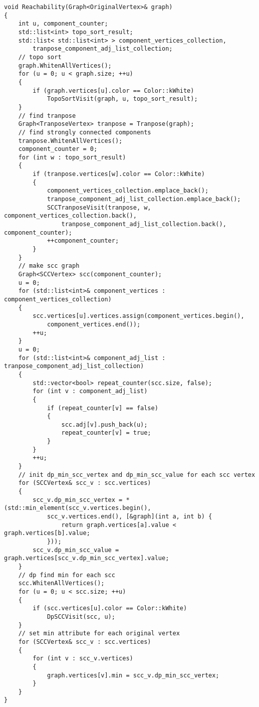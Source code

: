 \begin{verbatim}
void Reachability(Graph<OriginalVertex>& graph)
{
    int u, component_counter;
    std::list<int> topo_sort_result;
    std::list< std::list<int> > component_vertices_collection, 
        tranpose_component_adj_list_collection;
    // topo sort
    graph.WhitenAllVertices();
    for (u = 0; u < graph.size; ++u)
    {
        if (graph.vertices[u].color == Color::kWhite)
            TopoSortVisit(graph, u, topo_sort_result);
    }
    // find tranpose
    Graph<TranposeVertex> tranpose = Tranpose(graph);
    // find strongly connected components
    tranpose.WhitenAllVertices();
    component_counter = 0;
    for (int w : topo_sort_result)
    {
        if (tranpose.vertices[w].color == Color::kWhite)
        {
            component_vertices_collection.emplace_back();
            tranpose_component_adj_list_collection.emplace_back();
            SCCTranposeVisit(tranpose, w, component_vertices_collection.back(), 
                tranpose_component_adj_list_collection.back(), component_counter);
            ++component_counter;
        }
    }
    // make scc graph
    Graph<SCCVertex> scc(component_counter);
    u = 0;
    for (std::list<int>& component_vertices : component_vertices_collection)
    {
        scc.vertices[u].vertices.assign(component_vertices.begin(), 
            component_vertices.end());
        ++u;
    }
    u = 0;
    for (std::list<int>& component_adj_list : tranpose_component_adj_list_collection)
    {
        std::vector<bool> repeat_counter(scc.size, false);
        for (int v : component_adj_list)
        {
            if (repeat_counter[v] == false)
            {
                scc.adj[v].push_back(u);
                repeat_counter[v] = true;
            }
        }
        ++u;
    }
    // init dp_min_scc_vertex and dp_min_scc_value for each scc vertex
    for (SCCVertex& scc_v : scc.vertices)
    {
        scc_v.dp_min_scc_vertex = *(std::min_element(scc_v.vertices.begin(), 
            scc_v.vertices.end(), [&graph](int a, int b) { 
                return graph.vertices[a].value < graph.vertices[b].value; 
            }));
        scc_v.dp_min_scc_value = graph.vertices[scc_v.dp_min_scc_vertex].value;
    }
    // dp find min for each scc
    scc.WhitenAllVertices();
    for (u = 0; u < scc.size; ++u)
    {
        if (scc.vertices[u].color == Color::kWhite)
            DpSCCVisit(scc, u);
    }
    // set min attribute for each original vertex
    for (SCCVertex& scc_v : scc.vertices)
    {
        for (int v : scc_v.vertices)
        {
            graph.vertices[v].min = scc_v.dp_min_scc_vertex;
        }
    }
}
\end{verbatim}

